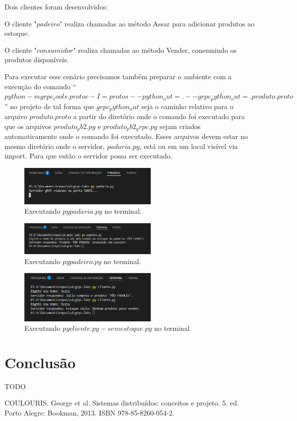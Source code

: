 \documentclass[12pt]{article}
\begin{document}
Dois clientes foram desenvolvidos:

O cliente "$padeiro$" realiza chamadas ao método Assar para adicionar produtos ao estoque.

O cliente "$consumidor$" realiza chamadas ao método Vender, consumindo os produtos disponíveis.

Para executar esse cenário precisamos também preparar o ambiente com a execução do comando ``$python -m grpc_tools.protoc -I=protos --python_out=. --grpc_python_out=. produto.proto$'' no projeto de tal forma que $grpc_python_out$ seja o caminho relativo para o arquivo $produto.proto$ a partir do diretório onde o comando foi executado para que os arquivos $produto_pb2.py$ e $produto_pb2_grpc.py$ sejam criados automaticamente onde o comando foi executado. Esses arquivos devem estar no mesmo diretório onde o servidor, $padaria.py$, está ou em um local visível via import. Para que então o servidor possa ser executado.


\begin{figure}
	\centering
	\includegraphics[width=0.6\textwidth]{py padaria.py.png}
	\caption{Executando $py padaria.py$ no terminal.}
	\label{fig:uml}
\end{figure}


\begin{figure}
	\centering
	\includegraphics[width=0.6\textwidth]{py padeiro.py.png}
	\caption{Executando $py padeiro.py$ no terminal.}
	\label{fig:uml}
\end{figure}

\begin{figure}
	\centering
	\includegraphics[width=0.6\textwidth]{py cliente.py - sem estoque.png}
	\caption{Executando $py cliente.py - sem estoque.py$ no terminal.}
	\label{fig:uml}
\end{figure}


\section{Conclusão}

TODO



COULOURIS, George et al. Sistemas distribuídos: conceitos e projeto. 5. ed. Porto Alegre: Bookman, 2013. ISBN 978-85-8260-054-2. 
\end{document}

